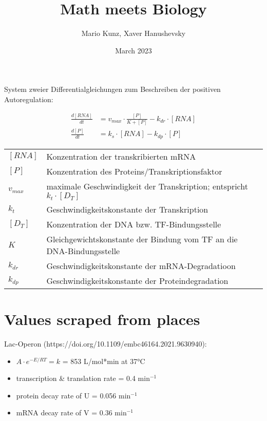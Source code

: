 \documentclass{article}
\title{Math meets Biology}
\author{Mario Kunz, Xaver Hanushevsky}
\date{March 2023}
\begin{document}
\maketitle

\newpage

System zweier Differentialgleichungen zum Beschreiben der positiven Autoregulation:

\begin{align*}
    \frac{d[RNA]}{dt}&=v_{max}\cdot\frac{[P]}{K+[P]}-k_{dr}\cdot[RNA] \\
    \frac{d[P]}{dt}&=k_s\cdot[RNA]-k_{dp}\cdot[P]
\end{align*}

\begin{tabular}{l l}
     $[RNA]$ & Konzentration der transkribierten mRNA \\
     $[P]$ & Konzentration des Proteins/Transkriptionsfaktor \\
     $v_{max}$ & maximale Geschwindigkeit der Transkription; entspricht $k_t\cdot [D_T]$ \\
     $k_t$ & Geschwindigkeitskonstante der Transkription \\
     $[D_T]$ & Konzentration der DNA bzw. TF-Bindungsstelle \\
     $K$ & Gleichgewichtskonstante der Bindung vom TF an die DNA-Bindungsstelle \\
     $k_{dr}$ & Geschwindigkeitskonstante der mRNA-Degradatioon \\
     $k_{dp}$ & Geschwindigkeitskonstante der Proteindegradation
\end{tabular}

\newpage
\section{Values scraped from places}
Lac-Operon (https://doi.org/10.1109/embc46164.2021.9630940):\\
\begin{itemize}
    \item $A \cdot e^{-E/RT} = k$ = 853 L/mol*min at 37°C
    \item transcription \& translation rate = 0.4 min$^{-1}$
    \item protein decay rate of U = 0.056 min$^{-1}$
    \item mRNA decay rate of V = 0.36 min$^{-1}$
\end{itemize}
\end{document}
